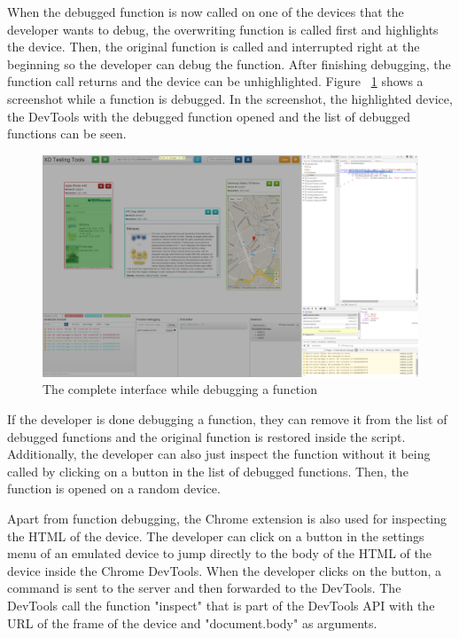 When the debugged function is now called on one of the devices that the developer wants to debug, the overwriting function is called first and highlights the device. Then, the original function is called and interrupted right at the beginning so the developer can debug the function. After finishing debugging, the function call returns and the device can be unhighlighted. Figure ~\ref{fig:function_debugging_complete} shows a screenshot while a function is debugged. In the screenshot, the highlighted device, the DevTools with the debugged function opened and the list of debugged functions can be seen.

\begin{figure}[H]
  \centering
    \includegraphics[width=1.0\textwidth]{images/screenshots/function_debugging_complete.png}
	\caption{The complete interface while debugging a function}
	\label{fig:function_debugging_complete}
\end{figure}

If the developer is done debugging a function, they can remove it from the list of debugged functions and the original function is restored inside the script. Additionally, the developer can also just inspect the function without it being called by clicking on a button in the list of debugged functions. Then, the function is opened on a random device. 

Apart from function debugging, the Chrome extension is also used for inspecting the HTML of the device. The developer can click on a button in the settings menu of an emulated device to jump directly to the body of the HTML of the device inside the Chrome DevTools. When the developer clicks on the button, a command is sent to the server and then forwarded to the DevTools. The DevTools call the function "inspect" that is part of the DevTools API with the URL of the frame of the device and "document.body" as arguments.


